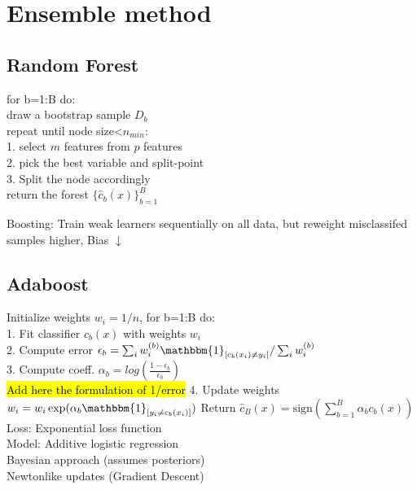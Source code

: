 \section{Ensemble method}
\subsection*{Random Forest}
for b=1:B do:\\
draw a bootstrap sample $D_b$\\
repeat until node size<$n_{min}$:\\
1. select $m$ features from $p$ features\\
2. pick the best variable and split-point\\
3. Split the node accordingly\\
return the forest $\{\hat{c}_b(x)\}_{b=1}^B$

Boosting: Train weak learners sequentially on all data, but reweight misclassifed samples higher, Bias $\downarrow$
\subsection*{Adaboost}
Initialize weights $w_i = 1/n$, for b=1:B do:\\
1. Fit classifier $c_b(x)$ with weights $w_i$\\
2. Compute error $\epsilon_b = \sum_i w_i^{(b)} \mathbbm{1}_{[c_b(x_i) \not = y_i]} / \sum_i w_i^{(b)}$\\
3. Compute coeff. $\alpha_b = log(\frac{1-\epsilon_b}{\epsilon_b})$\\
\hl{Add here the formulation of 1/error}
4. Update weights $w_i = w_i \exp(\alpha_b \mathbbm{1}_{[y_i \not = c_b(x_i)]})$
Return $\hat{c}_B(x) = \text{sign} \left ( \sum_{b=1}^B \alpha_b c_b(x) \right )$\\
Loss: Exponential loss function\\
Model: Additive logistic regression\\
Bayesian approach (assumes posteriors)\\
Newtonlike updates (Gradient Descent)


